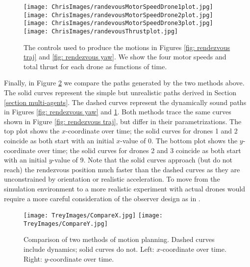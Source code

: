 \documentclass{aims}
\theoremstyle{definition}
\begin{document}
 
 \begin{figure}
    \centering
    \texttt{[image: ChrisImages/randevousMotorSpeedDrone1plot.jpg]}
    \texttt{[image: ChrisImages/randevousMotorSpeedDrone2plot.jpg]}
    \texttt{[image: ChrisImages/randevousMotorSpeedDrone3plot.jpg]}
    \texttt{[image: ChrisImages/randevousThrustplot.jpg]}
    \caption{The controls used to produce the motions in Figures \ref{fig: rendezvous traj} and \ref{fig: rendezvous yaw}.  We show the four motor speeds and total thrust for each drone as functions of time.}
    \label{fig: rendezvous controls}
\end{figure}
 
 Finally, in Figure \ref{fig: rendezvous compare} we compare the paths generated by the two methods above. 
 The solid curves represent the simple but unrealistic paths derived in Section \ref{section multi-agents}.
 The dashed curves represent the dynamically sound paths in Figures \ref{fig: rendezvous yaw} and \ref{fig: rendezvous controls}.  
 Both methods trace the same curves shown in Figure \ref{fig: rendezvous traj}, but differ in their parametrizations.
 The top plot shows the $x$-coordinate over time; the solid curves for drones 1 and 2 coincide as both start with an initial $x$-value of 0.
 The bottom plot shows the $y$-coordinate over time; the solid curves for drones 2 and 3 coincide as both start with an initial $y$-value of 9.
 Note that the solid curves approach (but do not reach) the rendezvous position much faster than the dashed curves as they are unconstrained by orientation or realistic acceleration.
To move from the simulation environment to a more realistic experiment with actual drones would require a more careful consideration of the observer design as in \cite{DistribControl}.

\begin{figure}
\texttt{[image: TreyImages/CompareX.jpg]}
\texttt{[image: TreyImages/CompareY.jpg]}
\caption{Comparison of two methods of motion planning.  Dashed curves include dynamics; solid curves do not.  Left: $x$-coordinate over time.  Right: $y$-coordinate over time.}
\label{fig: rendezvous compare}
\end{figure} 
 
\end{document}
